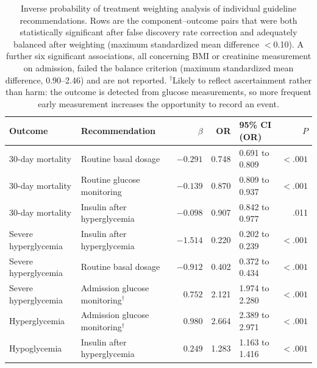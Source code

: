\begin{table}[t]
\centering
\caption{Inverse probability of treatment weighting analysis of individual
guideline recommendations. Rows are the component--outcome pairs that were
both statistically significant after false discovery rate correction and
adequately balanced after weighting (maximum standardized mean difference
$<$0.10). A further six significant associations, all concerning BMI or
creatinine measurement on admission, failed the balance criterion (maximum
standardized mean difference, 0.90--2.46) and are not reported.
$^{\dagger}$Likely to reflect ascertainment rather than harm: the outcome is
detected from glucose measurements, so more frequent early measurement
increases the opportunity to record an event.}
\label{tab:iptw-patterns}
\small
\setlength{\tabcolsep}{4pt}
\begin{tabular}{llrrlr}
\toprule
Outcome & Recommendation & $\beta$ & OR & 95\% CI (OR) & $P$ \\
\midrule
30-day mortality & Routine basal dosage
  & $-0.291$ & 0.748 & 0.691 to 0.809 & $<.001$ \\
30-day mortality & Routine glucose monitoring
  & $-0.139$ & 0.870 & 0.809 to 0.937 & $<.001$ \\
30-day mortality & Insulin after hyperglycemia
  & $-0.098$ & 0.907 & 0.842 to 0.977 & .011 \\
\midrule
Severe hyperglycemia & Insulin after hyperglycemia
  & $-1.514$ & 0.220 & 0.202 to 0.239 & $<.001$ \\
Severe hyperglycemia & Routine basal dosage
  & $-0.912$ & 0.402 & 0.372 to 0.434 & $<.001$ \\
Severe hyperglycemia & Admission glucose monitoring$^{\dagger}$
  & $0.752$ & 2.121 & 1.974 to 2.280 & $<.001$ \\
\midrule
Hyperglycemia & Admission glucose monitoring$^{\dagger}$
  & $0.980$ & 2.664 & 2.389 to 2.971 & $<.001$ \\
\midrule
Hypoglycemia & Insulin after hyperglycemia
  & $0.249$ & 1.283 & 1.163 to 1.416 & $<.001$ \\
\bottomrule
\end{tabular}
\end{table}

